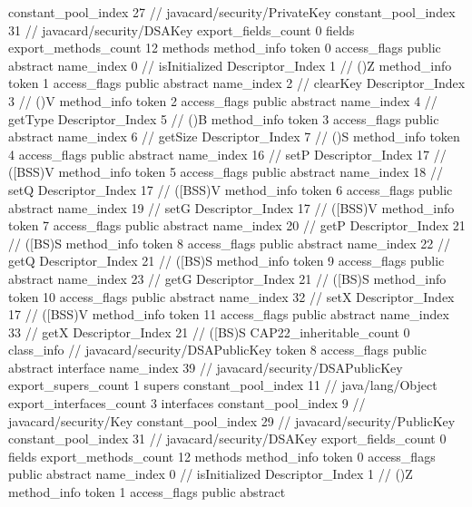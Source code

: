 {{{{				constant_pool_index	27		// javacard/security/PrivateKey
				constant_pool_index	31		// javacard/security/DSAKey
			}
			export_fields_count	0
			fields {
			}
			export_methods_count	12
			methods {
				method_info {
					token	0
					access_flags	public abstract
					name_index	0		// isInitialized
					Descriptor_Index	1		// ()Z
				}
				method_info {
					token	1
					access_flags	public abstract
					name_index	2		// clearKey
					Descriptor_Index	3		// ()V
				}
				method_info {
					token	2
					access_flags	public abstract
					name_index	4		// getType
					Descriptor_Index	5		// ()B
				}
				method_info {
					token	3
					access_flags	public abstract
					name_index	6		// getSize
					Descriptor_Index	7		// ()S
				}
				method_info {
					token	4
					access_flags	public abstract
					name_index	16		// setP
					Descriptor_Index	17		// ([BSS)V
				}
				method_info {
					token	5
					access_flags	public abstract
					name_index	18		// setQ
					Descriptor_Index	17		// ([BSS)V
				}
				method_info {
					token	6
					access_flags	public abstract
					name_index	19		// setG
					Descriptor_Index	17		// ([BSS)V
				}
				method_info {
					token	7
					access_flags	public abstract
					name_index	20		// getP
					Descriptor_Index	21		// ([BS)S
				}
				method_info {
					token	8
					access_flags	public abstract
					name_index	22		// getQ
					Descriptor_Index	21		// ([BS)S
				}
				method_info {
					token	9
					access_flags	public abstract
					name_index	23		// getG
					Descriptor_Index	21		// ([BS)S
				}
				method_info {
					token	10
					access_flags	public abstract
					name_index	32		// setX
					Descriptor_Index	17		// ([BSS)V
				}
				method_info {
					token	11
					access_flags	public abstract
					name_index	33		// getX
					Descriptor_Index	21		// ([BS)S
				}
			}
			CAP22_inheritable_count	0
		}
		class_info {		// javacard/security/DSAPublicKey
			token	8
			access_flags	public abstract interface
			name_index	39		// javacard/security/DSAPublicKey
			export_supers_count	1
			supers {
				constant_pool_index	11		// java/lang/Object
			}
			export_interfaces_count	3
			interfaces {
				constant_pool_index	9		// javacard/security/Key
				constant_pool_index	29		// javacard/security/PublicKey
				constant_pool_index	31		// javacard/security/DSAKey
			}
			export_fields_count	0
			fields {
			}
			export_methods_count	12
			methods {
				method_info {
					token	0
					access_flags	public abstract
					name_index	0		// isInitialized
					Descriptor_Index	1		// ()Z
				}
				method_info {
					token	1
					access_flags	public abstract
}}}}}
